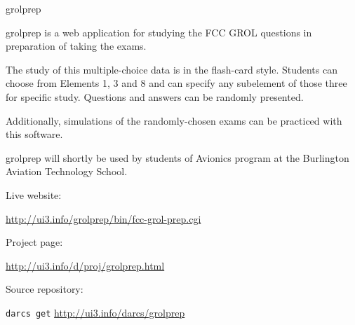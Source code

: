 \documentclass{scrreprt}
\begin{document}
\begin{hcarentry}{grolprep}
\makeheader

grolprep is a web application for studying the FCC GROL questions in preparation of taking the exams.

The study of this multiple-choice data is in the flash-card style. Students can choose from Elements 1, 3 and 8 and can specify any subelement of those three for specific study. Questions and answers can be randomly presented.

Additionally, simulations of the randomly-chosen exams can be practiced with this software.

grolprep will shortly be used by students of Avionics program at the Burlington Aviation Technology School.

\FurtherReading
\begin{compactitem}
\item Live website:

\url{http://ui3.info/grolprep/bin/fcc-grol-prep.cgi}

\item Project page:

\url{http://ui3.info/d/proj/grolprep.html}

\item Source repository:

\texttt{darcs get} \url{http://ui3.info/darcs/grolprep}
\end{compactitem}

\end{hcarentry}
\end{document}
